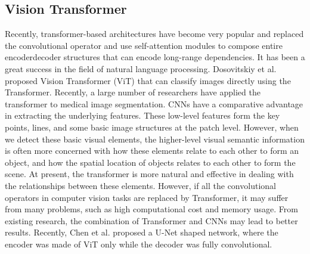 \subsection{Vision Transformer}
Recently, transformer-based architectures have become very popular and replaced
the convolutional operator and use self-attention modules to compose entire
encoderdecoder structures that can encode long-range dependencies. It has been a
great success in the field of natural language processing.
Dosovitskiy et al. \cite{dosovitskiy2020image} proposed Vision Transformer (ViT)
that can classify images directly using the Transformer. Recently, a large
number of researchers have applied the transformer to medical image
segmentation. CNNs have a comparative advantage in extracting the underlying
features. These low-level features form the key points, lines, and some basic
image structures at the patch level. However, when we detect these basic visual
elements, the higher-level visual semantic information is often more concerned
with how these elements relate to each other to form an object, and how the
spatial location of objects relates to each other to form the scene. At present,
the transformer is more natural and effective in dealing with the relationships
between these elements. However, if all the convolutional operators in computer
vision tasks are replaced by Transformer, it may suffer from many problems, such
as high computational cost and memory usage. From existing research, the
combination of Transformer and CNNs may lead to better results.
Recently, Chen et al. \cite{chen2021transunet} proposed a U-Net shaped network,
where the encoder was made of ViT only while the decoder was fully
convolutional.

